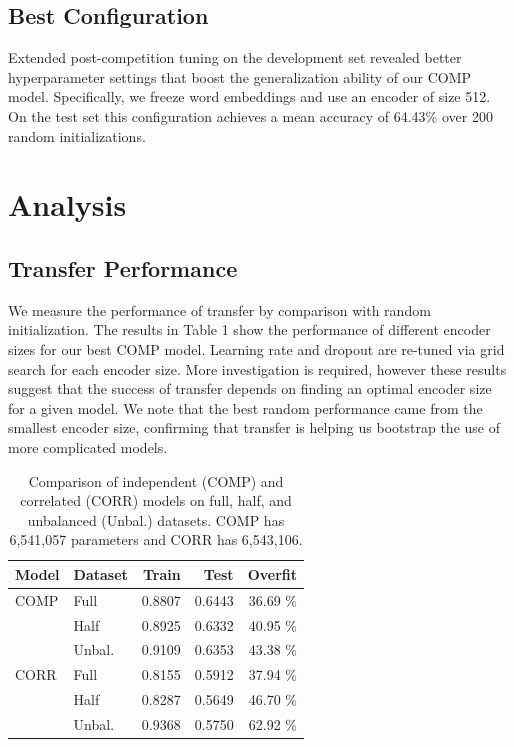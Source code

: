 \documentclass[11pt,a4paper]{article}
\begin{document}
\subsection{Best Configuration}

Extended post-competition tuning on the development set 
  revealed better hyperparameter settings
  that boost the generalization ability of our COMP model.
Specifically, we freeze word embeddings and use an encoder of size 512.
On the test set this configuration achieves a mean accuracy of 64.43\% over 200 random initializations.

\section{Analysis}

\subsection{Transfer Performance}

We measure the performance of transfer by comparison with random initialization.
The results in Table 1 show the performance of different encoder sizes for our best COMP model.
Learning rate and dropout are re-tuned via grid search for each encoder size.
More investigation is required, 
 however these results suggest that the success of transfer depends on 
 finding an optimal encoder size for a given model.
We note that the best random performance came from the smallest encoder size,
  confirming that transfer is helping us bootstrap the use of more complicated models.

\begin{table}[t]
\begin{center}
\begin{tabular}{llrrr}
\hline 
\bf Model & \bf Dataset & \bf Train & \bf Test & \bf Overfit \\ 
\hline
COMP & Full & 0.8807 & 0.6443 & 36.69 \% \\
     & Half & 0.8925 & 0.6332 & 40.95 \% \\
     & Unbal. & 0.9109 & 0.6353 & 43.38 \% \\
\hline
CORR & Full & 0.8155 & 0.5912 & 37.94 \% \\
     & Half & 0.8287 & 0.5649 & 46.70 \% \\
     & Unbal. & 0.9368 & 0.5750 & 62.92 \% \\
\hline
\end{tabular}
\end{center}
\caption{\label{font-table} Comparison of independent (COMP) and correlated (CORR) models
on full, half, and unbalanced (Unbal.) datasets.
COMP has 6,541,057 parameters and CORR has 6,543,106.}
\end{table}
\end{document}
